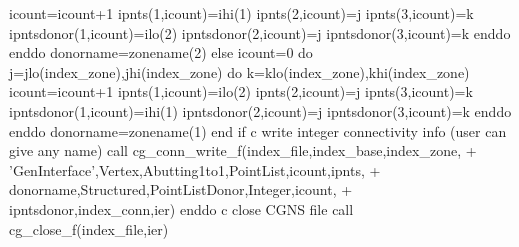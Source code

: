 \documentclass[12pt]{article}
\begin{document}
{\newline\indent\indent\indent\indent\indent       icount=icount+1
\newline\indent\indent\indent\indent\indent       ipnts(1,icount)=ihi(1)
\newline\indent\indent\indent\indent\indent       ipnts(2,icount)=j
\newline\indent\indent\indent\indent\indent       ipnts(3,icount)=k
\newline\indent\indent\indent\indent\indent       ipntsdonor(1,icount)=ilo(2)
\newline\indent\indent\indent\indent\indent       ipntsdonor(2,icount)=j
\newline\indent\indent\indent\indent\indent       ipntsdonor(3,icount)=k
\newline\indent\indent\indent\indent     enddo
\newline\indent\indent\indent   enddo
\newline\indent\indent\indent      donorname=zonename(2)
\newline\indent\indent   else
\newline\indent\indent\indent   icount=0
\newline\indent\indent\indent   do j=jlo(index\_zone),jhi(index\_zone)
\newline\indent\indent\indent\indent     do k=klo(index\_zone),khi(index\_zone)
\newline\indent\indent\indent\indent\indent       icount=icount+1
\newline\indent\indent\indent\indent\indent       ipnts(1,icount)=ilo(2)
\newline\indent\indent\indent\indent\indent       ipnts(2,icount)=j
\newline\indent\indent\indent\indent\indent       ipnts(3,icount)=k
\newline\indent\indent\indent\indent\indent       ipntsdonor(1,icount)=ihi(1)
\newline\indent\indent\indent\indent\indent       ipntsdonor(2,icount)=j
\newline\indent\indent\indent\indent\indent       ipntsdonor(3,icount)=k
\newline\indent\indent\indent\indent     enddo
\newline\indent\indent\indent   enddo
\newline\indent\indent\indent      donorname=zonename(1)
\newline\indent\indent   end if
\newline c   write integer connectivity info (user can give any name)
\newline\indent\indent   call cg\_conn\_write\_f(index\_file,index\_base,index\_zone,
\newline\indent + \indent 'GenInterface',Vertex,Abutting1to1,PointList,icount,ipnts,
\newline\indent + \indent donorname,Structured,PointListDonor,Integer,icount,
\newline\indent + \indent ipntsdonor,index\_conn,ier)
\newline\indent      enddo
\newline c  close CGNS file
\newline\indent      call cg\_close\_f(index\_file,ier)}
\end{document}
